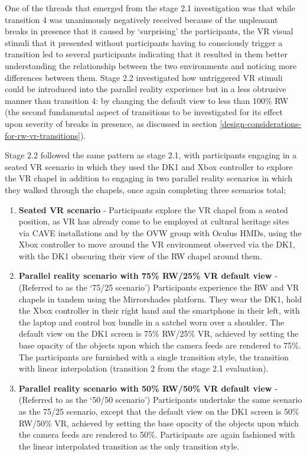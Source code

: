 One of the threads that emerged from the stage 2.1 investigation was that while transition 4 was unanimously negatively received because of the unpleasant breaks in presence that it caused by `surprising' the participants, the VR visual stimuli that it presented without participants having to consciously trigger a transition led to several participants indicating that it resulted in them better understanding the relationship between the two environments and noticing more differences between them. Stage 2.2 investigated how untriggered VR stimuli could be introduced into the parallel reality experience but in a less obtrusive manner than transition 4: by changing the default view to less than 100\% RW (the second fundamental aspect of transitions to be investigated for its effect upon severity of breaks in presence, as discussed in section \ref{design-considerations-for-rw-vr-transitions}).

Stage 2.2 followed the same pattern as stage 2.1, with participants engaging in a seated VR scenario in which they used the DK1 and Xbox controller to explore the VR chapel in addition to engaging in two parallel reality scenarios in which they walked through the chapels, once again completing three scenarios total;

\begin{enumerate}
	\item \textbf{Seated VR scenario} - Participants explore the VR chapel from a seated position, as VR has already come to be employed at cultural heritage sites via CAVE installations and by the OVW group with Oculus HMDs, using the Xbox controller to move around the VR environment observed via the DK1, with the DK1 obscuring their view of the RW chapel around them.
	\item \textbf{Parallel reality scenario with 75\% RW/25\% VR default view} - (Referred to as the `75/25 scenario') Participants experience the RW and VR chapels in tandem using the Mirrorshades platform. They wear the DK1, hold the Xbox controller in their right hand and the smartphone in their left, with the laptop and control box bundle in a satchel worn over a shoulder. The default view on the DK1 screen is 75\% RW/25\% VR, achieved by setting the base opacity of the objects upon which the camera feeds are rendered to 75\%. The participants are furnished with a single transition style, the transition with linear interpolation (transition 2 from the stage 2.1 evaluation).
	\item \textbf{Parallel reality scenario with 50\% RW/50\% VR default view} - (Referred to as the `50/50 scenario') Participants undertake the same scenario as the 75/25 scenario, except that the default view on the DK1 screen is 50\% RW/50\% VR, achieved by setting the base opacity of the objects upon which the camera feeds are rendered to 50\%. Participants are again fashioned with the linear interpolated transition as the only transition style.
\end{enumerate}

